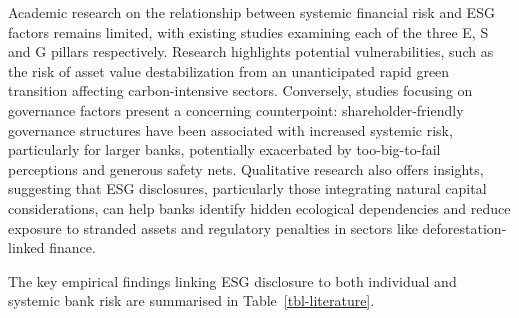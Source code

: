 \documentclass[
  authoryear]{elsarticle}
\begin{document}
Academic research on the relationship between systemic financial risk
and ESG factors remains limited, with existing studies examining each of
the three E, S and G pillars respectively. Research highlights potential
vulnerabilities, such as the risk of asset value destabilization from an
unanticipated rapid green transition affecting carbon-intensive sectors.
Conversely, studies focusing on governance factors present a concerning
counterpoint: shareholder-friendly governance structures have been
associated with increased systemic risk, particularly for larger banks,
potentially exacerbated by too-big-to-fail perceptions and generous
safety nets. Qualitative research also offers insights, suggesting that
ESG disclosures, particularly those integrating natural capital
considerations, can help banks identify hidden ecological dependencies
and reduce exposure to stranded assets and regulatory penalties in
sectors like deforestation-linked finance.

The key empirical findings linking ESG disclosure to both individual and
systemic bank risk are summarised in Table~\ref{tbl-literature}.
\end{document}
